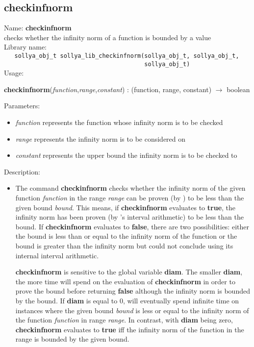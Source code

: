 \subsection{checkinfnorm}
\label{labcheckinfnorm}
\noindent Name: \textbf{checkinfnorm}\\
\phantom{aaa}checks whether the infinity norm of a function is bounded by a value\\[0.2cm]
\noindent Library name:\\
\verb|   sollya_obj_t sollya_lib_checkinfnorm(sollya_obj_t, sollya_obj_t,|\\
\verb|                                        sollya_obj_t)|\\[0.2cm]
\noindent Usage: 
\begin{center}
\textbf{checkinfnorm}(\emph{function},\emph{range},\emph{constant}) : (\textsf{function}, \textsf{range}, \textsf{constant}) $\rightarrow$ \textsf{boolean}\\
\end{center}
Parameters: 
\begin{itemize}
\item \emph{function} represents the function whose infinity norm is to be checked
\item \emph{range} represents the infinity norm is to be considered on
\item \emph{constant} represents the upper bound the infinity norm is to be checked to
\end{itemize}
\noindent Description: \begin{itemize}

\item The command \textbf{checkinfnorm} checks whether the infinity norm of the given
   function \emph{function} in the range \emph{range} can be proven (by \sollya) to
   be less than the given bound \emph{bound}. This means, if \textbf{checkinfnorm}
   evaluates to \textbf{true}, the infinity norm has been proven (by \sollya's
   interval arithmetic) to be less than the bound. If \textbf{checkinfnorm} evaluates
   to \textbf{false}, there are two possibilities: either the bound is less than
   or equal to the infinity norm of the function or the bound is greater
   than the infinity norm but \sollya could not conclude using its
   internal interval arithmetic.
    
   \textbf{checkinfnorm} is sensitive to the global variable \textbf{diam}. The smaller \textbf{diam},
   the more time \sollya will spend on the evaluation of \textbf{checkinfnorm} in
   order to prove the bound before returning \textbf{false} although the infinity
   norm is bounded by the bound. If \textbf{diam} is equal to $0$, \sollya will
   eventually spend infinite time on instances where the given bound
   \emph{bound} is less or equal to the infinity norm of the function
   \emph{function} in range \emph{range}. In contrast, with \textbf{diam} being zero,
   \textbf{checkinfnorm} evaluates to \textbf{true} iff the infinity norm of the function in
   the range is bounded by the given bound.
\end{itemize}
